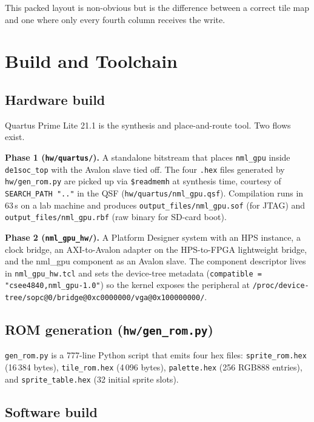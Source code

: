 \documentclass[11pt,letterpaper]{article}
\begin{document}
This packed layout is non-obvious but is the difference between a correct
tile map and one where only every fourth column receives the write.

\section{Build and Toolchain}

\subsection{Hardware build}

Quartus Prime Lite 21.1 is the synthesis and place-and-route tool. Two flows
exist.

\textbf{Phase 1 (\texttt{hw/quartus/}).} A standalone bitstream that places
\texttt{nml\_gpu} inside \texttt{de1soc\_top} with the Avalon slave tied off.
The four \texttt{.hex} files generated by \texttt{hw/gen\_rom.py} are picked
up via \texttt{\$readmemh} at synthesis time, courtesy of
\texttt{SEARCH\_PATH ".."} in the QSF (\texttt{hw/quartus/nml\_gpu.qsf}).
Compilation runs in 63\,s on a lab machine and produces
\texttt{output\_files/nml\_gpu.sof} (for JTAG) and
\texttt{output\_files/nml\_gpu.rbf} (raw binary for SD-card boot).

\textbf{Phase 2 (\texttt{nml\_gpu\_hw/}).} A Platform Designer system with an
HPS instance, a clock bridge, an AXI-to-Avalon adapter on the HPS-to-FPGA
lightweight bridge, and the nml\_gpu component as an Avalon slave. The
component descriptor lives in \texttt{nml\_gpu\_hw.tcl} and sets the
device-tree metadata (\texttt{compatible = "csee4840,nml\_gpu-1.0"}) so the
kernel exposes the peripheral at
\texttt{/proc/device-tree/sopc@0/bridge@0xc0000000/vga@0x100000000/}.

\subsection{ROM generation (\texttt{hw/gen\_rom.py})}

\texttt{gen\_rom.py} is a 777-line Python script that emits four hex files:
\texttt{sprite\_rom.hex} (16\,384 bytes), \texttt{tile\_rom.hex} (4\,096
bytes), \texttt{palette.hex} (256 RGB888 entries), and
\texttt{sprite\_table.hex} (32 initial sprite slots).

\subsection{Software build}
\end{document}
